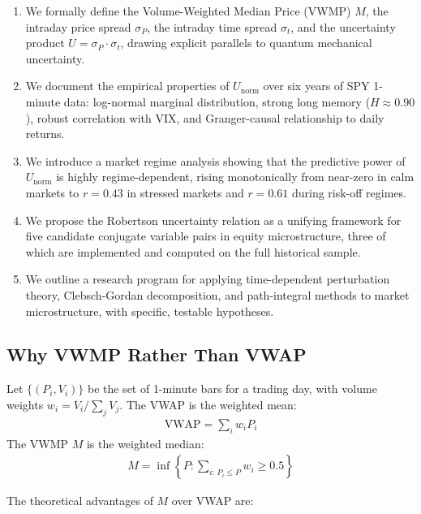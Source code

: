 \documentclass[11pt]{article}
\begin{document}
\begin{enumerate}
    \item We formally define the Volume-Weighted Median Price (VWMP) $M$, the intraday price spread $\sigma_P$, the intraday time spread $\sigma_t$, and the uncertainty product $U = \sigma_P \cdot \sigma_t$, drawing explicit parallels to quantum mechanical uncertainty.

    \item We document the empirical properties of $U_\mathrm{norm}$ over six years of SPY 1-minute data: log-normal marginal distribution, strong long memory ($H \approx 0.90$), robust correlation with VIX, and Granger-causal relationship to daily returns.

    \item We introduce a market regime analysis showing that the predictive power of $U_\mathrm{norm}$ is highly regime-dependent, rising monotonically from near-zero in calm markets to $r = 0.43$ in stressed markets and $r = 0.61$ during risk-off regimes.

    \item We propose the Robertson uncertainty relation as a unifying framework for five candidate conjugate variable pairs in equity microstructure, three of which are implemented and computed on the full historical sample.

    \item We outline a research program for applying time-dependent perturbation theory, Clebsch-Gordan decomposition, and path-integral methods to market microstructure, with specific, testable hypotheses.
\end{enumerate}

\subsection{Why VWMP Rather Than VWAP}

Let $\{(P_i, V_i)\}$ be the set of 1-minute bars for a trading day, with volume weights $w_i = V_i / \sum_j V_j$. The VWAP is the weighted mean:
\begin{align}
    \mathrm{VWAP} = \sum_i w_i P_i
\end{align}
The VWMP $M$ is the weighted median:
\begin{align}
    M = \inf\left\{P : \sum_{i:\, P_i \leq P} w_i \geq 0.5\right\}
\end{align}

The theoretical advantages of $M$ over VWAP are:
\end{document}
